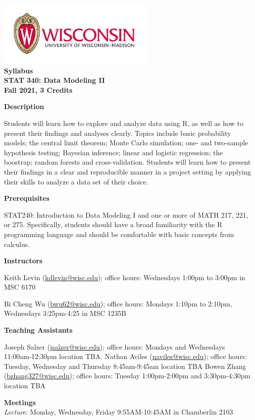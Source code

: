 \documentclass[11pt,oneside]{amsart}
\newcommand{\header}[1]{\bigbreak\textbf{#1}}
\begin{document}
\begin{center}
  \bf
  \includegraphics[width=3in]{color-flush-UWlogo-print} \\
  Syllabus \\
  STAT 340: Data Modeling II \\
  Fall 2021, 3 Credits 
\end{center}

\header{Description}

Students will learn how to explore and analyze data using R, as well as how to present their findings and analyses clearly.
Topics include basic probability models; the central limit theorem; Monte Carlo simulation; one- and two-sample hypothesis testing; Bayesian inference; linear and logistic regression; the boostrap; random forests and cross-validation.
Students will learn how to present their findings in a clear and reproducible manner in a project setting by applying their skills to analyze a data set of their choice.

\header{Prerequisites}

STAT240: Introduction to Data Modeling I
and one or more of MATH 217, 221, or 275.
Specifically, students should have a broad familiarity with the R programming language and should be comfortable with basic concepts from calculus.

\header{Instructors}

Keith Levin (\url{kdlevin@wisc.edu}); office hours: Wednesdays 1:00pm to 3:00pm in MSC 6170

Bi Cheng Wu (\url{bwu62@wisc.edu}); office hours: Mondays 1:10pm to 2:10pm, Wednesdays 3:25pm-4:25 in MSC 1235B

\header{Teaching Assistants}

Joseph Salzer (\url{jsalzer@wisc.edu}); office hours: Mondays and Wednesdays 11:00am-12:30pm location TBA.
Nathan Aviles (\url{naviles@wisc.edu}); office hours: Tuesday, Wednesday and Thursday 8:45am-9:45am location TBA
Bowen Zhang (\url{bzhang327@wisc.edu}); office hours: Tuesday 1:00pm-2:00pm and 3:30pm-4:30pm location TBA

\header{Meetings}\\
{\em Lecture}: Monday, Wednesday, Friday 9:55AM-10:45AM in Chamberlin 2103
\end{document}
